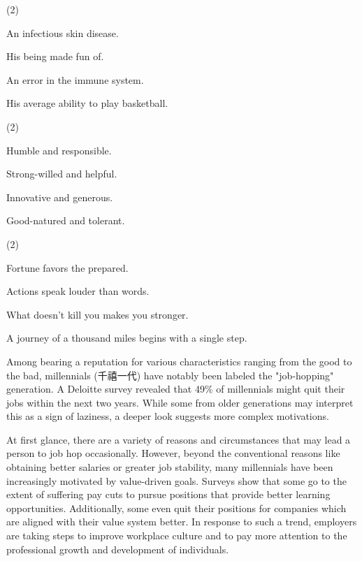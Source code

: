 \documentclass{英语试卷}
\begin{document}
\begin{choices}(2)
  \item An infectious skin disease.
  \item His being made fun of.
  \item An error in the immune system.
  \item His average ability to play basketball.
\end{choices}
\begin{choices}(2)
  \item Humble and responsible.
  \item Strong-willed and helpful.
  \item Innovative and generous.
  \item Good-natured and tolerant.
\end{choices}
\begin{choices}(2)
  \item Fortune favors the prepared.
  \item Actions speak louder than words.
  \item What doesn't kill you makes you stronger.
  \item A journey of a thousand miles begins with a single step.
\end{choices}
\par Among bearing a reputation for various characteristics ranging from the good to the bad, millennials (千禧一代) have notably been labeled the "job-hopping" generation. A Deloitte survey revealed that 49\% of millennials might quit their jobs within the next two years. While some from older generations may interpret this as a sign of laziness, a deeper look suggests more complex motivations.\par
\par At first glance, there are a variety of reasons and circumstances that may lead a person to job hop occasionally. However, beyond the conventional reasons like obtaining better salaries or greater job stability, many millennials have been increasingly motivated by value-driven goals. Surveys show that some go to the extent of suffering pay cuts to pursue positions that provide better learning opportunities. Additionally, some even quit their positions for companies which are aligned with their value system better. In response to such a trend, employers are taking steps to improve workplace culture and to pay more attention to the professional growth and development of individuals.\par
\end{document}
